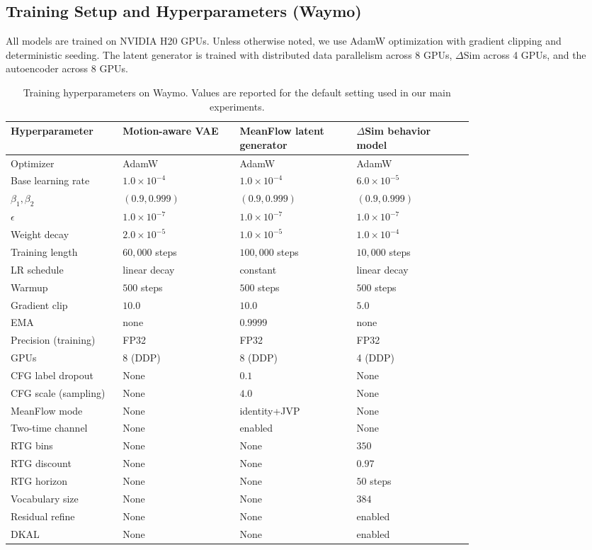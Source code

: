 \documentclass{article}
\theoremstyle{plain}
\theoremstyle{definition}
\theoremstyle{remark}
\begin{document}
\subsection{Training Setup and Hyperparameters (Waymo)}
\label{app:training}

All models are trained on NVIDIA H20 GPUs. Unless otherwise noted, we use AdamW optimization with gradient clipping and deterministic
seeding. The latent generator is trained with distributed data parallelism across 8 GPUs, \(\Delta\)Sim across 4 GPUs, and the autoencoder across 8 GPUs.

\begin{table}[t]
\centering
\small
\caption{Training hyperparameters on Waymo. Values are reported for the default setting used in our main experiments.}
\label{tab:training-hparams}
\begin{tabular}{p{0.16\linewidth}p{0.20\linewidth}p{0.20\linewidth}p{0.20\linewidth}}
\toprule
Hyperparameter & Motion-aware VAE & MeanFlow latent generator & \(\Delta\)Sim behavior model \\
\midrule
Optimizer & AdamW & AdamW & AdamW \\
Base learning rate & \(1.0\times 10^{-4}\) & \(1.0\times 10^{-4}\) & \(6.0\times 10^{-5}\) \\
\(\beta_1,\beta_2\) & \((0.9,0.999)\) & \((0.9,0.999)\) & \((0.9,0.999)\) \\
\(\epsilon\) & \(1.0\times 10^{-7}\) & \(1.0\times 10^{-7}\) & \(1.0\times 10^{-7}\) \\
Weight decay & \(2.0\times 10^{-5}\) & \(1.0\times 10^{-5}\) & \(1.0\times 10^{-4}\) \\
Training length & \(60{,}000\) steps & \(100{,}000\) steps & \(10{,}000\) steps \\
LR schedule & linear decay & constant & linear decay \\
Warmup & \(500\) steps & \(500\) steps & \(500\) steps \\
Gradient clip & \(10.0\) & \(10.0\) & \(5.0\) \\
EMA & none & \(0.9999\) & none \\
Precision (training) & FP32 & FP32 & FP32 \\
GPUs & 8 (DDP) & 8 (DDP) & 4 (DDP) \\
\midrule
CFG label dropout & None & \(0.1\) & None \\
CFG scale (sampling) & None & \(4.0\) & None \\
MeanFlow mode & None & identity+JVP & None \\
Two-time channel & None & enabled & None \\
\midrule
RTG bins & None & None & \(350\) \\
RTG discount & None & None & \(0.97\) \\
RTG horizon & None & None & \(50\) steps \\
Vocabulary size & None & None & \(384\) \\
Residual refine & None & None & enabled \\
DKAL & None & None & enabled \\
\bottomrule
\end{tabular}
\end{table}
\end{document}
